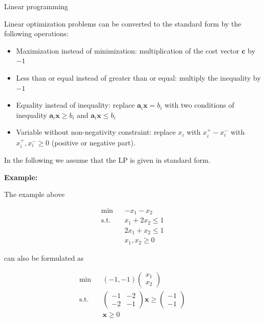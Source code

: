 \begin{vbframe}{Linear programming}
\framebreak

Linear optimization problems can be converted to the standard form by the following operations:

\begin{itemize}
\item Maximization instead of minimization: multiplication of the cost vector $\bm{c}$ by $-1$
\item Less than or equal instead of greater than or equal: multiply the inequality by $-1$
\item Equality instead of inequality: replace $\bm{a}_i\bm{x}=b_i$ with two conditions of inequality $\bm{a}_i\bm{x}\ge b_i$ and $\bm{a}_i\bm{x}\le b_i$
\item Variable without non-negativity constraint: replace $x_i$ with $x_i^+ - x_i^-$ with $x_i^+, x_i^- \ge 0$ (positive or negative part).
\end{itemize}

In the following we assume that the LP is given in standard form.

\framebreak

\textbf{Example:}

\lz

The example above

\vspace*{-1cm}
\begin{eqnarray*}
\min && - x_1 - x_2 \\
\text{s.t. } && x_1 + 2x_2 \le 1\\
&& 2x_1 + x_2 \le 1 \\
&& x_1, x_2 \ge 0
\end{eqnarray*}

can also be formulated as

\vspace*{-0.2cm}

\begin{eqnarray*}
\min && (-1, -1) \begin{pmatrix} x_1 \\ x_2 \end{pmatrix} \\
\text{s.t. } &&  \begin{pmatrix} - 1 & - 2 \\ - 2 & - 1 \end{pmatrix} \bm{x} \ge \begin{pmatrix} - 1 \\ - 1
\end{pmatrix} \\
&& \bm{x} \ge 0
\end{eqnarray*}

\end{vbframe}


